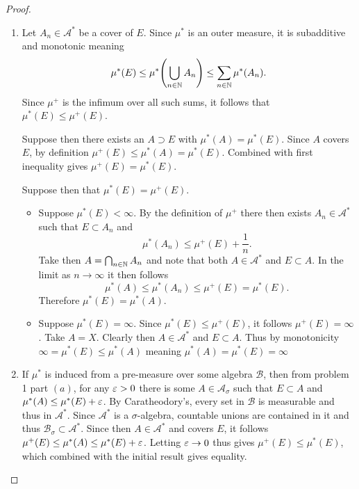 \documentclass[hw_all.tex]{subfiles}
\begin{document}
\begin{proof}
    \begin{enumerate}
        \item
            Let $A_n \in \mathcal{A}^*$ be a cover of $E$. Since $\mu^*$ is an outer measure, it is subadditive and monotonic meaning
            \[
                \mu^*(E) \leq \mu^*\qty(\bigcup_{n \in \mathbb{N}} A_n) \leq \sum_{n \in \mathbb{N}} \mu^*(A_n)
            .\]
            Since $\mu^+$ is the infimum over all such sums, it follows that $\mu^*(E) \leq \mu^+(E)$.

            Suppose then there exists an $A \supset E$ with $\mu^*(A) = \mu^*(E)$. Since $A$ covers $E$, by definition $\mu^+(E) \leq \mu^*(A) = \mu^*(E)$. Combined with first inequality gives $\mu^+(E) = \mu^*(E)$.

            Suppose then that $\mu^*(E) = \mu^+(E)$.
            \begin{itemize}
                \item
                    Suppose $\mu^*(E) < \infty$. By the definition of $\mu^+$ there then exists $A_n \in \mathcal{A}^*$ such that $E \subset A_n$ and
                    \[
                        \mu^*(A_n) \leq \mu^+(E) + \frac{1}{n}
                    .\]
                    Take then $A = \bigcap_{n \in \mathbb{N}} A_n$ and note that both $A \in \mathcal{A}^*$ and $E \subset A$. In the limit as $n \to \infty$ it then follows
                    \[
                        \mu^*(A) \leq \mu^*(A_n) \leq \mu^+(E) = \mu^*(E)
                    .\]
                    Therefore $\mu^*(E) = \mu^*(A)$.

                \item
                    Suppose $\mu^*(E) = \infty$. Since $\mu^*(E) \leq \mu^+(E)$, it follows $\mu^+(E) = \infty$. Take $A = X$. Clearly then $A \in \mathcal{A}^*$ and $E \subset A$. Thus by monotonicity $\infty = \mu^*(E) \leq \mu^*(A)$ meaning $\mu^*(A) = \mu^*(E) = \infty$
            \end{itemize}

        \item
            If $\mu^*$ is induced from a pre-measure over some algebra $\mathcal{B}$, then from problem 1 part $(a)$, for any $\varepsilon > 0$ there is some $A \in \mathcal{A}_{\sigma}$ such that $E \subset A$ and $\mu^*(A) \leq \mu^*(E) + \varepsilon$. By Caratheodory's, every set in $\mathcal{B}$ is measurable and thus in $\mathcal{A}^*$. Since $\mathcal{A}^*$ is a $\sigma$-algebra, countable unions are contained in it and thus $\mathcal{B}_{\sigma} \subset \mathcal{A}^*$. Since then $A \in \mathcal{A}^*$ and covers $E$, it follows $\mu^+(E) \leq \mu^*(A) \leq \mu^*(E) + \varepsilon$. Letting $\varepsilon \to 0$ thus gives $\mu^+(E) \leq \mu^*(E)$, which combined with the initial result gives equality.


\end{enumerate}
\end{proof}
\end{document}
